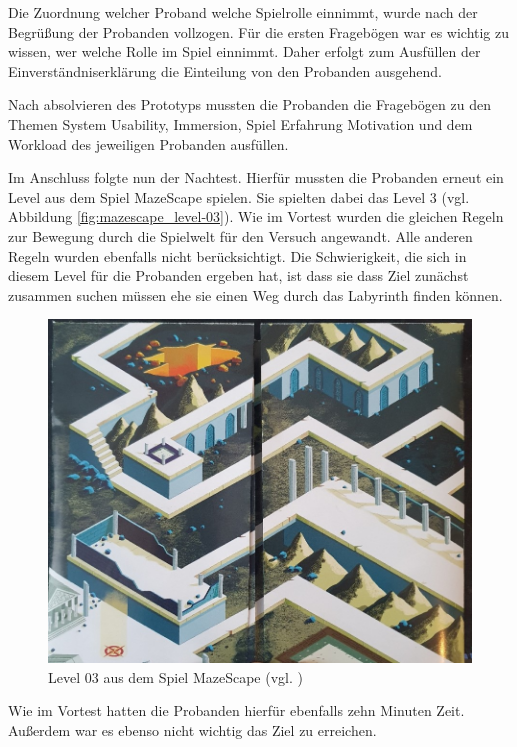 Die Zuordnung welcher Proband welche Spielrolle einnimmt, wurde nach der Begrüßung der Probanden vollzogen. Für die ersten Fragebögen war es wichtig zu wissen, wer welche Rolle im Spiel einnimmt. Daher erfolgt zum Ausfüllen der Einverständniserklärung die Einteilung von den Probanden ausgehend.

Nach absolvieren des Prototyps mussten die Probanden die Fragebögen zu den Themen System Usability, Immersion, Spiel Erfahrung Motivation und dem Workload des jeweiligen Probanden ausfüllen.

Im Anschluss folgte nun der Nachtest. Hierfür mussten die Probanden erneut ein Level aus dem Spiel MazeScape spielen. Sie spielten dabei das Level 3 (vgl. Abbildung \ref{fig:mazescape_level-03}). Wie im Vortest wurden die gleichen Regeln zur Bewegung durch die Spielwelt für den Versuch angewandt. Alle anderen Regeln wurden ebenfalls nicht berücksichtigt. Die Schwierigkeit, die sich in diesem Level für die Probanden ergeben hat, ist dass sie dass Ziel zunächst zusammen suchen müssen ehe sie einen Weg durch das Labyrinth finden können.

\begin{figure}[ht]
\centering
\includegraphics[width=1\linewidth]{content/pictures/MazeScape_Level03.jpg}
\caption{Level 03 aus dem Spiel MazeScape (vgl. \cite{noauthor_mazescape_nodate})}
\label{fig:mazescape_level-02}
\end{figure}

Wie im Vortest hatten die Probanden hierfür ebenfalls zehn Minuten Zeit. Außerdem war es ebenso nicht wichtig das Ziel zu erreichen.

